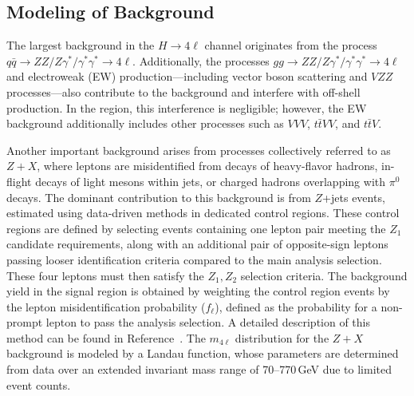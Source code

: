 
\subsection{Modeling of Background}

The largest background in the $H \to 4\ell$ channel originates from the process $q\bar{q} \to ZZ/Z\gamma^*/\gamma^*\gamma^* \to 4\ell$. Additionally, the processes $gg \to ZZ/Z\gamma^*/\gamma^*\gamma^* \to 4\ell$ and electroweak (EW) production---including vector boson scattering and $VZZ$ processes---also contribute to the background and interfere with off-shell \Hboson production. In the \onshell region, this interference is negligible; however, the EW background additionally includes other processes such as $VVV$, $t\bar{t}VV$, and $t\bar{t}V$. 

Another important background arises from processes collectively referred to as $Z+X$, where leptons are misidentified from decays of heavy-flavor hadrons, in-flight decays of light mesons within jets, or charged hadrons overlapping with $\pi^0$ decays. The dominant contribution to this background is from $Z$+jets events, estimated using data-driven methods in dedicated control regions. These control regions are defined by selecting events containing one lepton pair meeting the ${Z}_{1}$ candidate requirements, along with an additional pair of opposite-sign leptons passing looser identification criteria compared to the main analysis selection. These four leptons must then satisfy the ${Z}_{1}, {Z}_{2}$ selection criteria. The background yield in the signal region is obtained by weighting the control region events by the lepton misidentification probability ($f_{\ell}$), defined as the probability for a non-prompt lepton to pass the analysis selection. A detailed description of this method can be found in Reference~\cite{Sirunyan:2017exp}. The $m_{4\ell}$ distribution for the $Z+X$ background is modeled by a Landau function, whose parameters are determined from data over an extended invariant mass range of 70--770\,GeV due to limited event counts.

